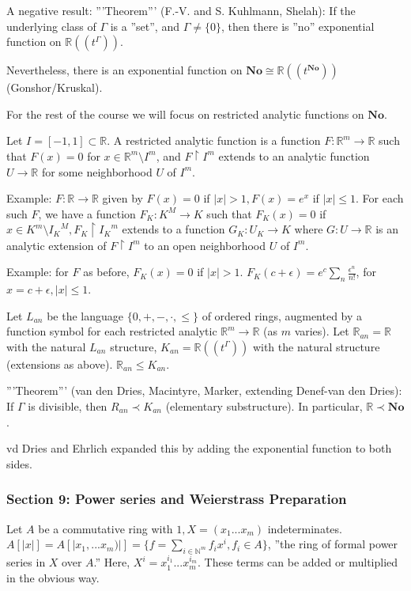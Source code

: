 A negative result:
'''Theorem''' (F.-V. and S. Kuhlmann, Shelah): If the underlying class of $\Gamma$ is a ''set'', and $\Gamma \neq \{0\}$, then there is ''no'' exponential function on $\mathbb{R}((t^{\Gamma}))$.

Nevertheless, there is an exponential function on $\mathbf{No} \cong \mathbb{R}((t^{\mathbf{No}}))$ (Gonshor/Kruskal).

For the rest of the course we will focus on restricted analytic functions on $\mathbf{No}$.

Let $I=[-1,1] \subset \mathbb{R}$. A restricted analytic function is a function $F: \mathbb{R}^m \rightarrow \mathbb{R}$ such that $F(x)=0$ for $x \in \mathbb{R}^{m} \setminus I^m$, and $F \restriction I^m$ extends to an analytic function $U \rightarrow \mathbb{R}$ for some neighborhood $U$ of $I^m$.

Example: $F: \mathbb{R} \rightarrow \mathbb{R}$ given by $F(x)=0$ if $|x|>1, F(x)=e^x$ if $|x| \leq 1$. For each such $F$, we have a function $F_K: K^M \rightarrow K$ such that $F_K(x)=0$ if $x \in K^m \setminus {I_K}^M, F_K \restriction {I_K}^m$ extends to a function $G_K: U_K \rightarrow K$ where $G: U \rightarrow \mathbb{R}$ is an analytic extension of $F \restriction I^m$ to an open neighborhood $U$ of $I^m$.

Example: for $F$ as before, $F_K(x)=0$ if $|x|>1$. $F_K(c+\epsilon)=e^{c}\sum_{n} \frac{\epsilon^n}{n!}$, for $x=c+\epsilon, |x| \leq 1$.

Let $L_{an}$ be the language $\{0,+, -, \cdot, \leq\}$ of ordered rings, augmented by a function symbol for each restricted analytic $\mathbb{R}^m \rightarrow \mathbb{R}$ (as $m$ varies). Let $\mathbb{R}_{an} = \mathbb{R}$ with the natural $L_{an}$ structure, $K_{an}=\mathbb{R}((t^{\Gamma}))$ with the natural structure (extensions as above). $\mathbb{R}_{an} \leq K_{an}$.

'''Theorem''' (van den Dries, Macintyre, Marker, extending Denef-van den Dries): If $\Gamma$ is divisible, then $R_{an} \prec K_{an}$ (elementary substructure). In particular, $\mathbb{R} \prec \mathbf{No}$.

vd Dries and Ehrlich expanded this by adding the exponential function to both sides.

\subsubsection{Section 9: Power series and Weierstrass Preparation}
Let $A$ be a commutative ring with $1, X=(x_1...x_m)$ indeterminates. $A[|x|]=A[|x_1, ...x_m)|]=\{f=\sum_{i \in \mathbb{N}^m}f_i x^i, f_i \in A\}$, ''the ring of formal power series in $X$ over $A$.'' Here, $X^i= x_{1}^{i_1}...x_{m}^{i_m}$. These terms can be added or multiplied in the obvious way.

